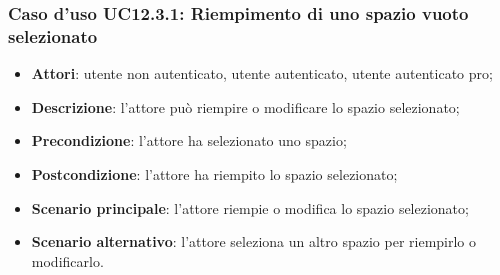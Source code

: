 \subsubsection{Caso d'uso UC12.3.1: Riempimento di uno spazio vuoto selezionato}
\begin{itemize}
\item \textbf{Attori}: utente non autenticato, utente autenticato, utente autenticato pro;
\item \textbf{Descrizione}: l'attore può riempire o modificare lo spazio selezionato;
\item \textbf{Precondizione}: l'attore ha selezionato uno spazio;
\item \textbf{Postcondizione}: l'attore ha riempito lo spazio selezionato;
\item \textbf{Scenario principale}: l'attore riempie o modifica lo spazio selezionato;
\item \textbf{Scenario alternativo}: l'attore seleziona un altro spazio per riempirlo o modificarlo. 
\end{itemize}

